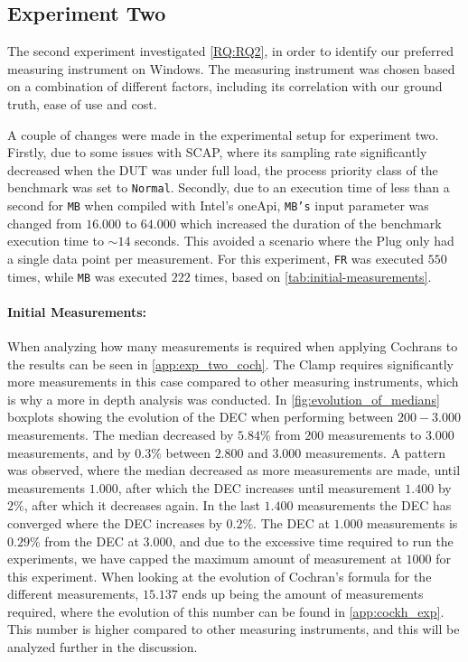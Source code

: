 \subsection{Experiment Two}\label{subsec:exp_two}

The second experiment investigated \cref{RQ:RQ2}, in order to identify our preferred measuring instrument on Windows. The measuring instrument was chosen based on a combination of different factors, including its correlation with our ground truth, ease of use and cost. 

A couple of changes were made in the experimental setup for experiment two. Firstly, due to some issues with SCAP, where its sampling rate significantly decreased when the DUT was under full load, the process priority class of the benchmark was set to \texttt{Normal}. Secondly, due to an execution time of less than a second for \texttt{MB} when compiled with Intel's oneApi, \texttt{MB's} input parameter was changed from $16.000$ to $64.000$ which increased the duration of the benchmark execution time to $\sim 14$ seconds. This avoided a scenario where the Plug only had a single data point per measurement. For this experiment, \texttt{FR} was executed $550$ times, while \texttt{MB} was executed $222$ times, based on \cref{tab:initial-measurements}.

\paragraph{Initial Measurements:} When analyzing how many measurements is required when applying Cochrans to the results can be seen in \cref{app:exp_two_coch}. %
The Clamp requires significantly more measurements in this case compared to other measuring instruments, which is why a more in depth analysis was conducted. In \cref{fig:evolution_of_medians} boxplots showing the evolution of the DEC when performing between $200-3.000$ measurements. The median decreased by $5.84\%$ from $200$ measurements to $3.000$ measurements, and by $0.3\%$ between $2.800$ and $3.000$ measurements. A pattern was observed, where the median decreased as more measurements are made, until measurements $1.000$, after which the DEC increases until measurement $1.400$ by $2\%$, after which it decreases again. In the last $1.400$ measurements the DEC has converged where the DEC increases by $0.2\%$. The DEC at $1.000$ measurements is $0.29\%$ from the DEC at $3.000$, and due to the excessive time required to run the experiments, we have capped the maximum amount of measurement at $1000$ for this experiment. When looking at the evolution of Cochran's formula for the different measurements, $15.137$ ends up being the amount of measurements required, where the evolution of this number can be found in \cref{app:cockh_exp}. This number is higher compared to other measuring instruments, and this will be analyzed further in the discussion.

